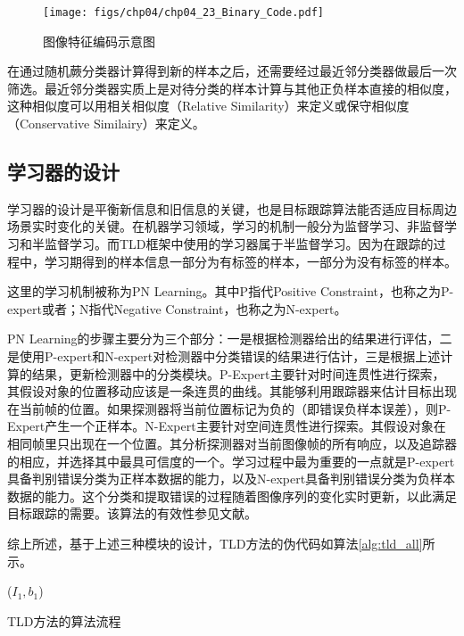\begin{figure}[ht]   
	\centering
	\texttt{[image: figs/chp04/chp04\_23\_Binary\_Code.pdf]}
	\caption{图像特征编码示意图}
	\label{fig:chp04_23_Binary_Code}
\end{figure}

在通过随机蕨分类器计算得到新的样本之后，还需要经过最近邻分类器做最后一次筛选。最近邻分类器实质上是对待分类的样本计算与其他正负样本直接的相似度，这种相似度可以用相关相似度（Relative Similarity）来定义或保守相似度（Conservative Similairy）来定义。

\subsection{学习器的设计}
学习器的设计是平衡新信息和旧信息的关键，也是目标跟踪算法能否适应目标周边场景实时变化的关键。在机器学习领域，学习的机制一般分为监督学习、非监督学习和半监督学习。而TLD框架中使用的学习器属于半监督学习。因为在跟踪的过程中，学习期得到的样本信息一部分为有标签的样本，一部分为没有标签的样本。

这里的学习机制被称为PN Learning。其中P指代Positive Constraint，也称之为P-expert或者；N指代Negative Constraint，也称之为N-expert。

PN Learning的步骤主要分为三个部分：一是根据检测器给出的结果进行评估，二是使用P-expert和N-expert对检测器中分类错误的结果进行估计，三是根据上述计算的结果，更新检测器中的分类模块。P-Expert主要针对时间连贯性进行探索，其假设对象的位置移动应该是一条连贯的曲线。其能够利用跟踪器来估计目标出现在当前帧的位置。如果探测器将当前位置标记为负的（即错误负样本误差），则P-Expert产生一个正样本。N-Expert主要针对空间连贯性进行探索。其假设对象在相同帧里只出现在一个位置。其分析探测器对当前图像帧的所有响应，以及追踪器的相应，并选择其中最具可信度的一个。学习过程中最为重要的一点就是P-expert具备判别错误分类为正样本数据的能力，以及N-expert具备判别错误分类为负样本数据的能力。这个分类和提取错误的过程随着图像序列的变化实时更新，以此满足目标跟踪的需要。该算法的有效性参见文献\cite{kalal2010}。

综上所述，基于上述三种模块的设计，TLD方法的伪代码如算法\ref{alg:tld_all}所示。
\begin{algorithm2e}[ht]
	\SetAlgoLined
	\BlankLine
	\LearningInitialization($I_1,b_1$)\;	
	\caption{TLD方法的算法流程}
	\label{alg:tld_all}
\end{algorithm2e}

